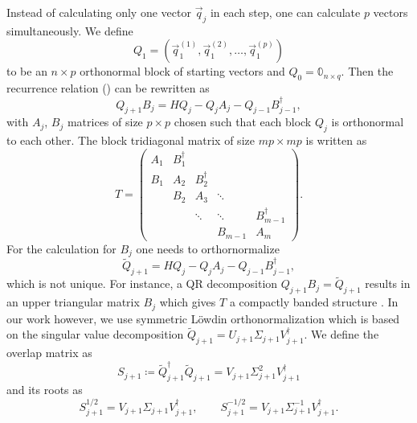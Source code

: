 Instead of calculating only one vector $\vec{q}_j$ in each step,
one can calculate $p$ vectors simultaneously.
We define
\begin{equation}
    Q_1 = (\vec{q}_1^{(1)}, \vec{q}_1^{(2)}, \ldots, \vec{q}_1^{(p)})
\end{equation}
to be an $n\times p$ orthonormal block of starting vectors
and $Q_0 = \mathbb{0}_{n\times q}$.
Then the recurrence relation () can be rewritten as
\begin{equation}
    Q_{j+1} B_j = H Q_j - Q_j A_j - Q_{j-1} B_{j-1}^\dag,
    \label{eq:block-Lanczos-recurrence}
\end{equation}
with $A_j$, $B_j$ matrices of size $p\times p$ chosen such that each block $Q_j$ is orthonormal
to each other.
The block tridiagonal matrix of size $mp\times mp$ is written as
\begin{equation}
    T
    =
    \begin{pmatrix}
        A_1 & B_1^\dag &          &         &              \\
        B_1 & A_2      & B_2^\dag &         &              \\
            & B_2      & A_3      & \ddots  &              \\
            &          & \ddots   & \ddots  & B_{m-1}^\dag \\
            &          &          & B_{m-1} & A_m
    \end{pmatrix}.
    \label{eq:tridiagonal-block}
\end{equation}
For the calculation for $B_j$ one needs to orthornormalize
\begin{equation}
    \tilde Q_{j+1} = H Q_j - Q_j A_j - Q_{j-1} B_{j-1}^\dag,
\end{equation}
which is not unique.
For instance, a QR decomposition $Q_{j+1} B_j = \tilde Q_{j+1}$
results in an upper triangular matrix $B_j$ which gives $T$ a compactly banded structure
\cite{Cullum1985, Golub2013}.
In our work however, we use symmetric Löwdin orthonormalization \cite{Lowdin1950, Brass2021}
which is based on the singular value decomposition
$\tilde Q_{j+1} = U_{j+1} \Sigma_{j+1} V_{j+1}^\dag$.
We define the overlap matrix as
\begin{equation}
    S_{j+1} \coloneqq \tilde Q_{j+1}^\dag \tilde Q_{j+1} = V_{j+1} \Sigma_{j+1}^2 V_{j+1}^\dagger
\end{equation}
and its roots as
\begin{equation}
    S_{j+1}^{1/2}  = V_{j+1} \Sigma_{j+1} V_{j+1}^\dagger,
    \qquad
    S_{j+1}^{-1/2} = V_{j+1} \Sigma_{j+1}^{-1} V_{j+1}^\dagger.
\end{equation}
